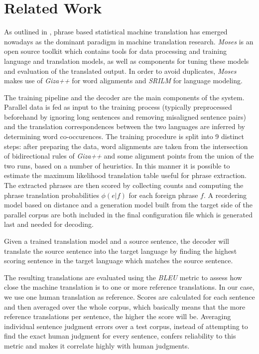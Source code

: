 \documentclass[11pt]{article}
\begin{document}
\section{Related Work}
\label{existing}
As outlined in \cite{moses}, phrase based statistical machine translation has emerged nowadays as the dominant paradigm in machine translation research. \textit{Moses} \cite{mosesurl} is an open source toolkit which contains tools for data processing and training language and translation models, as well as components for tuning these models and evaluation of the translated output. In order to avoid duplicates, \textit{Moses} makes use of \textit{Giza++} \cite{giza++} for word alignments and \textit{SRILM} \cite{srilm} for language modeling. 

The training pipeline and the decoder are the main components of the system. Parallel data is fed as input to the training process (typically preprocessed beforehand by ignoring long sentences and removing misaligned sentence pairs) and the translation correspondences between the two languages are inferred by determining word co-occurences. The training procedure is split into 9 distinct steps: after preparing the data, word alignments are taken from the intersection of bidirectional rules of \textit{Giza++} and some alignment points from the union of the two runs, based on a number of heuristics. In this manner it is possible to estimate the maximum likelihood translation table useful for phrase extraction. The extracted phrases are then scored by collecting counts and computing the phrase translation probabilities $\phi(e|f)$ for each foreign phrase $f$. A reordering model based on distance and a generation model built from the target side of the parallel corpus are both included in the final configuration file which is generated last and needed for decoding.

Given a trained translation model and a source sentence, the decoder will translate the source sentence into the target language by finding the highest scoring sentence in the target language which matches the source sentence.%

The resulting translations are evaluated using the \textit{BLEU} metric to assess how close the machine translation is to one or more reference translations. In our case, we use one human translation as reference. Scores are calculated for each sentence and then averaged over the whole corpus, which basically means that the more reference translations per sentence, the higher the score will be. Averaging individual sentence judgment errors over a test corpus, instead of attempting to find the exact human judgment for every sentence, confers reliability to this metric and makes it correlate highly with human judgments.
\end{document}
